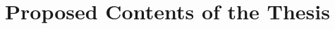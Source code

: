 \documentclass[MS,synopsis]{iitmdiss}
\begin{document}

\section{Proposed Contents of the Thesis}

%
%
%
%
%
%
%
\end{document}
